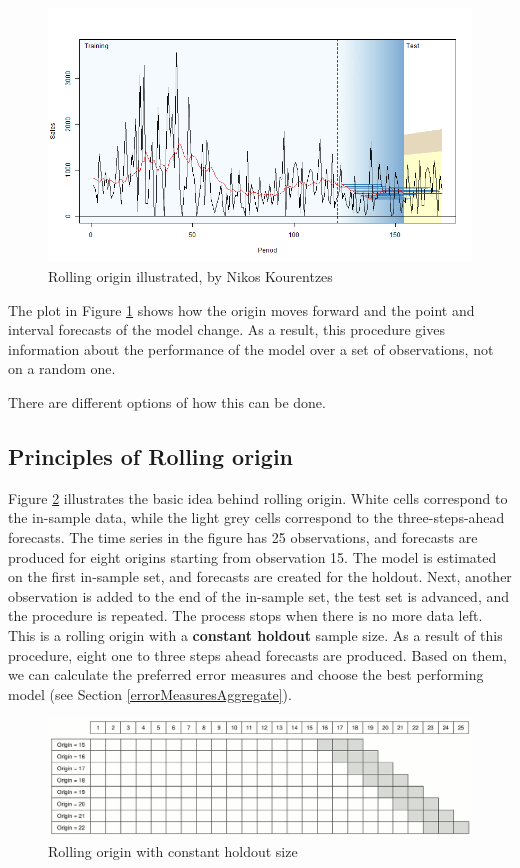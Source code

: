 \documentclass[]{book}
\theoremstyle{definition}
\theoremstyle{definition}
\theoremstyle{definition}
\theoremstyle{definition}
\theoremstyle{remark}
\begin{document}
\begin{figure}
\includegraphics[width=0.75\linewidth]{./images/03-ROAnimation} \caption{Rolling origin illustrated, by Nikos Kourentzes}\label{fig:ROProcessAnimation}
\end{figure}

The plot in Figure \ref{fig:ROProcessAnimation} shows how the origin moves forward and the point and interval forecasts of the model change. As a result, this procedure gives information about the performance of the model over a set of observations, not on a random one.

There are different options of how this can be done.

\hypertarget{principles-of-rolling-origin}{%
\subsection{Principles of Rolling origin}\label{principles-of-rolling-origin}}

Figure \ref{fig:ROProcessCO} \citep{Svetunkov2017} illustrates the basic idea behind rolling origin. White cells correspond to the in-sample data, while the light grey cells correspond to the three-steps-ahead forecasts. The time series in the figure has 25 observations, and forecasts are produced for eight origins starting from observation 15. The model is estimated on the first in-sample set, and forecasts are created for the holdout. Next, another observation is added to the end of the in-sample set, the test set is advanced, and the procedure is repeated. The process stops when there is no more data left. This is a rolling origin with a \textbf{constant holdout} sample size. As a result of this procedure, eight one to three steps ahead forecasts are produced. Based on them, we can calculate the preferred error measures and choose the best performing model (see Section \ref{errorMeasuresAggregate}).

\begin{figure}
\includegraphics[width=0.75\linewidth]{./images/03-ROProcessCO} \caption{Rolling origin with constant holdout size}\label{fig:ROProcessCO}
\end{figure}
\end{document}
